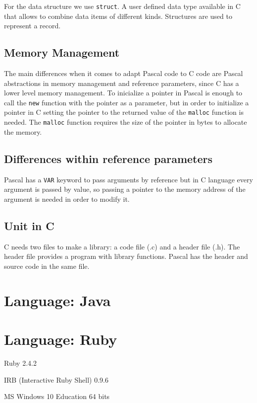 \documentclass[11pt]{scrartcl} %
\begin{document}
For the data structure we use \texttt{struct}. A user defined data type available in C that allows to combine data items of different kinds. Structures are used to represent a record. 

\subsection*{Memory Management}

The main differences when it comes to adapt Pascal code to C code are Pascal abstractions in memory management and reference parameters, since C has a lower level memory management. To inicialize a pointer in Pascal is enough to call the \texttt{new} function with the pointer as a parameter, but in order to initialize a pointer in C setting the pointer to the returned value of the \texttt{malloc} function is needed. The \texttt{malloc} function requires the size of the pointer in bytes to allocate the memory.

\subsection*{Differences within reference parameters}

Pascal has a \texttt{VAR} keyword to pass arguments by reference but in C language every argument is passed by value, so passing a pointer to the memory address of the argument is needed in order to modify it.

\subsection*{Unit in C}

C needs two files to make a library: a code file (.c) and a header file (.h). The header file provides a program with library functions.
Pascal has the header and source code in the same file.

\section{Language: Java}


\section{Language: Ruby}

\begin{description}[align=left,labelwidth=10em]
\item [Language Version] Ruby 2.4.2
\item [Interpreter] IRB (Interactive Ruby Shell) 0.9.6
\item [Operating System] MS Windows 10 Education 64 bits
\end{description}
\end{document}
